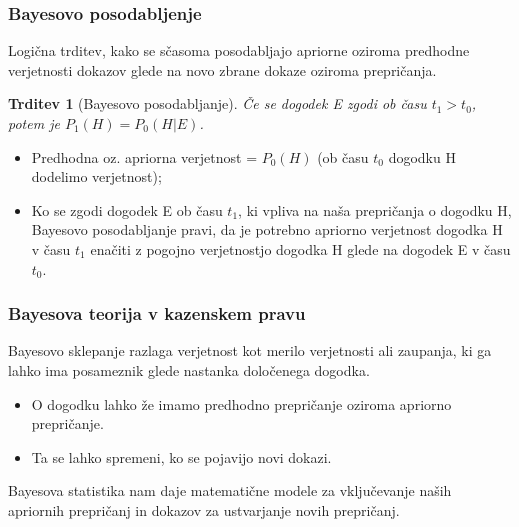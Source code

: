 \documentclass{beamer}
\newtheorem{trditev}{Trditev}
\begin{document}
\begin{frame}
    \frametitle{Bayesovo posodabljenje}
    Logična trditev, kako se sčasoma posodabljajo apriorne oziroma predhodne verjetnosti dokazov glede na novo zbrane dokaze oziroma prepričanja. \vspace{3mm}
    \begin{trditev}[Bayesovo posodabljanje]
        Če se dogodek E zgodi ob času $t_1 > t_0$, potem je $P_1(H) = P_0(H \lvert E)$.
    \end{trditev}
    \begin{itemize}
        \item Predhodna oz. apriorna verjetnost = $P_0(H)$ (ob času $t_0$ dogodku H dodelimo verjetnost);
        \item Ko se zgodi dogodek E ob času $t_1$, ki vpliva na naša prepričanja o dogodku H, Bayesovo posodabljanje pravi, da je potrebno apriorno 
        verjetnost dogodka H v času $t_1$ enačiti z pogojno verjetnostjo dogodka H glede na dogodek E v času $t_0$. 
    \end{itemize}
\end{frame}

\begin{frame}
    \frametitle{Bayesova teorija v kazenskem pravu}
    Bayesovo sklepanje razlaga verjetnost kot merilo verjetnosti ali zaupanja, ki ga lahko ima posameznik glede nastanka določenega dogodka.
    \begin{itemize}
      \item O dogodku lahko že imamo predhodno prepričanje oziroma apriorno prepričanje.
      \item Ta se lahko spremeni, ko se pojavijo novi dokazi.
    \end{itemize} \vspace{3mm}
    Bayesova statistika nam daje matematične modele za vključevanje naših apriornih prepričanj in dokazov za ustvarjanje novih prepričanj.
\end{frame}
\end{document}
